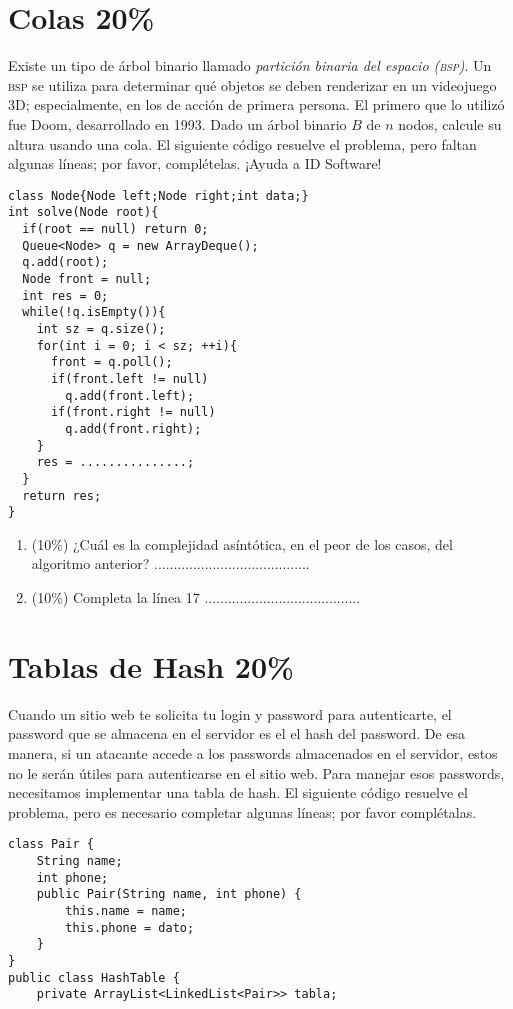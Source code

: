 \documentclass[10 pt]{article}
\begin{document}
\begin{multicols}{2}
\section{Colas 20\%}
Existe un tipo de árbol binario llamado \textit{partición binaria del espacio (\textsc{bsp})}. Un \textsc{bsp} se utiliza para determinar qué objetos se deben renderizar en un videojuego 3D; especialmente, en los de acción de primera persona. El primero que lo utilizó fue Doom, desarrollado en 1993. 
Dado un árbol binario $B$ de $n$ nodos, calcule su altura usando una cola. El siguiente código resuelve el problema, pero faltan algunas líneas; por favor, complételas. ¡Ayuda a ID Software!

\begin{lstlisting}
class Node{Node left;Node right;int data;}
int solve(Node root){
  if(root == null) return 0;
  Queue<Node> q = new ArrayDeque();
  q.add(root);
  Node front = null;
  int res = 0;
  while(!q.isEmpty()){
    int sz = q.size();
    for(int i = 0; i < sz; ++i){
      front = q.poll();
      if(front.left != null)
        q.add(front.left);
      if(front.right != null)
        q.add(front.right);
    }
    res = ...............;
  }
  return res;
}
\end{lstlisting}
\begin{enumerate}[label=\Alph*]
	\item (10\%) ¿Cuál es la complejidad asíntótica, en el peor de los casos, del algoritmo anterior? ........................................
	\item (10\%) Completa la línea 17 ........................................
\end{enumerate}
\section{Tablas de Hash 20\%}
Cuando un sitio web te solicita tu login y password para autenticarte, el password que se almacena en el servidor es el el hash del password. De esa manera, si un atacante accede a los passwords almacenados en el servidor, estos no le serán útiles para autenticarse en el sitio web. Para manejar esos passwords, necesitamos implementar una tabla de hash. El siguiente código resuelve el problema, pero es necesario completar algunas líneas; por favor complétalas. 
{\small
\begin{lstlisting}
class Pair {
    String name;
    int phone;
    public Pair(String name, int phone) {
        this.name = name;
        this.phone = dato;
    }
}
public class HashTable {
    private ArrayList<LinkedList<Pair>> tabla;


\end{lstlisting}}
\end{multicols}
\end{document}
